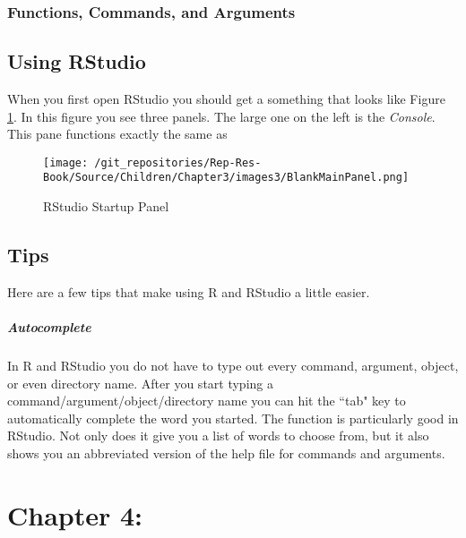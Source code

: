\documentclass[ChapterTOCs,krantz1]{krantz}\usepackage{graphicx, color}
\begin{document}
\subsection{Functions, Commands, and Arguments}

\section{Using RStudio}

When you first open RStudio you should get a something that looks like Figure \ref{BlankMain}. In this figure you see three panels. The large one on the left is the {\emph{Console}}. This pane functions exactly the same as 

\begin{figure}[t]
    \caption{RStudio Startup Panel}
    \label{BlankMain}

    \texttt{[image: /git\_repositories/Rep-Res-Book/Source/Children/Chapter3/images3/BlankMainPanel.png]}
\end{figure}


\section{Tips}

Here are a few tips that make using R and RStudio a little easier.

\paragraph{Autocomplete}

In R and RStudio you do not have to type out every command, argument, object, or even directory name. After you start typing a command/argument/object/directory name you can hit the ``tab" key to automatically complete the word you started. The  function is particularly good in RStudio. Not only does it give you a list of words to choose from, but it also shows you an abbreviated version of the help file for commands and arguments.





\chapter{Chapter 4:}
\end{document}
